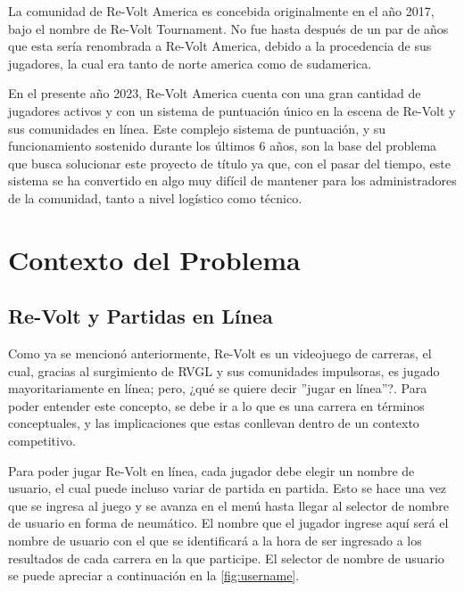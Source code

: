 La comunidad de Re-Volt America es concebida originalmente en el año 2017, bajo el nombre de Re-Volt Tournament. No fue hasta después de un par de años que esta sería renombrada a Re-Volt America, debido a la procedencia de sus jugadores, la cual era tanto de norte america como de sudamerica.

En el presente año 2023, Re-Volt America cuenta con una gran cantidad de jugadores activos y con un sistema de puntuación único en la escena de Re-Volt y sus comunidades en línea. Este complejo sistema de puntuación, y su funcionamiento sostenido durante los últimos 6 años, son la base del problema que busca solucionar este proyecto de título ya que, con el pasar del tiempo, este sistema se ha convertido en algo muy difícil de mantener para los administradores de la comunidad, tanto a nivel logístico como técnico.

\section{Contexto del Problema}
\subsection{Re-Volt y Partidas en Línea}
Como ya se mencionó anteriormente, Re-Volt es un videojuego de carreras, el cual, gracias al surgimiento de RVGL y sus comunidades impulsoras, es jugado mayoritariamente en línea; pero, ¿qué se quiere decir ''jugar en línea''?. Para poder entender este concepto, se debe ir a lo que es una carrera en términos conceptuales, y las implicaciones que estas conllevan dentro de un contexto competitivo.

Para poder jugar Re-Volt en línea, cada jugador debe elegir un nombre de usuario, el cual puede incluso variar de partida en partida. Esto se hace una vez que se ingresa al juego y se avanza en el menú hasta llegar al selector de nombre de usuario en forma de neumático. El nombre que el jugador ingrese aquí será el nombre de usuario con el que se identificará a la hora de ser ingresado a los resultados de cada carrera en la que participe. El selector de nombre de usuario se puede apreciar a continuación en la \autoref{fig:username}.

